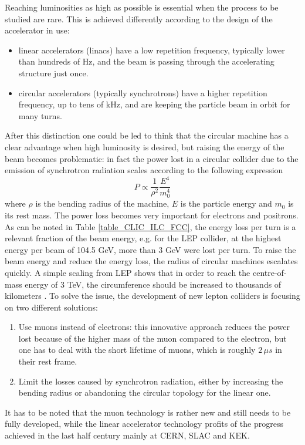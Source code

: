 Reaching luminosities as high as possible is essential when the process to be studied are rare. This is achieved differently according to the design of the accelerator in use:
\begin{itemize}
\item linear accelerators (linacs) have a low repetition frequency, typically lower than hundreds of Hz, and the beam is passing through the accelerating structure just once.
\item circular accelerators (typically synchrotrons) have a higher repetition frequency, up to tens of kHz, and are keeping the particle beam in orbit for many turns.
\end{itemize}
After this distinction one could be led to think that the circular machine has a clear advantage when high luminosity is desired, but raising the energy of the beam becomes problematic: in fact the power lost in a circular collider due to the emission of synchrotron radiation scales according to the following expression
\begin{equation}
P \propto \frac{1}{\rho^2} \frac{E^4}{m_0^4}
\end{equation}
where $\rho$ is the bending radius of the machine, $E$ is the particle energy and $m_0$ is its rest mass. The power loss becomes very important for electrons and positrons. As can be noted in Table \ref{table_CLIC_ILC_FCC}, the energy loss per turn is a relevant fraction of the beam energy, e.g. for the LEP collider, at the highest  energy per beam of 104.5 GeV, more than 3 GeV were lost per turn. To raise the beam energy and reduce the energy loss, the radius of circular machines escalates quickly. A simple scaling from LEP shows that in order to reach the centre-of-mass energy of 3 TeV, the circumference should be increased to thousands of kilometers \cite{nature:CLIC}.
To solve the issue, the development of new lepton colliders is focusing on two different solutions:
\begin{enumerate}
\item Use muons instead of electrons: this innovative approach reduces the power lost because of the higher mass of the muon compared to the electron, but one has to deal with the short lifetime of muons, which is roughly $2 \, \mu s$ in their rest frame.
\item Limit the losses caused by synchrotron radiation, either by increasing the bending radius or abandoning the circular topology for the linear one.
\end{enumerate}
It has to be noted that the muon technology is rather new and still needs to be fully developed, while the linear accelerator technology profits of the progress achieved in the last half century mainly at CERN, SLAC and KEK.

